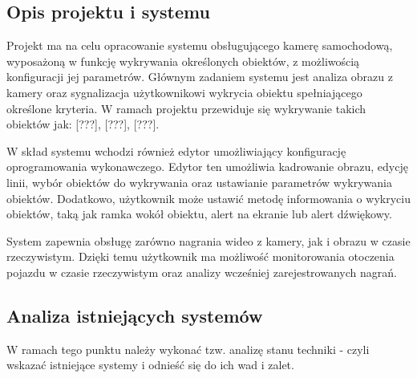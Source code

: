     \subsection{Opis projektu i systemu}
    Projekt ma na celu opracowanie systemu obsługującego kamerę samochodową, wyposażoną 
    w funkcję wykrywania określonych obiektów, z możliwością konfiguracji jej parametrów. 
    Głównym zadaniem systemu jest analiza obrazu z kamery oraz sygnalizacja użytkownikowi wykrycia 
    obiektu spełniającego określone kryteria. 
    W ramach projektu przewiduje się wykrywanie takich obiektów jak: [???], [???], [???].

    W skład systemu wchodzi również edytor umożliwiający konfigurację oprogramowania wykonawczego. 
    Edytor ten umożliwia kadrowanie obrazu, edycję linii, wybór obiektów do wykrywania oraz ustawianie 
    parametrów wykrywania obiektów. Dodatkowo, użytkownik może ustawić metodę informowania o wykryciu obiektów, 
    taką jak ramka wokół obiektu, alert na ekranie lub alert dźwiękowy.

    System zapewnia obsługę zarówno nagrania wideo z kamery, jak i obrazu w czasie rzeczywistym. 
    Dzięki temu użytkownik ma możliwość monitorowania otoczenia pojazdu w czasie rzeczywistym oraz analizy
    wcześniej zarejestrowanych nagrań. 

    \subsection{Analiza istniejących systemów} %
    W ramach tego punktu należy wykonać tzw. analizę stanu techniki - czyli wskazać istniejące systemy i odnieść się do ich wad i zalet.